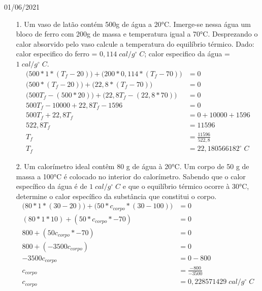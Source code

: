 \documentclass{SchoolBook}
\begin{document}
    \begin{day}{01/06/2021}
        \begin{enumerate}
            \item[1.] Um vaso de latão contém 500g de água a 20°C. Imerge-se nessa água um bloco de ferro com 200g de massa e temperatura igual a 70°C. Desprezando o calor absorvido pelo vaso calcule a temperatura do equilíbrio térmico. Dado: calor especifico do ferro = $0,114\;cal/g^\circ\;C$; calor especifico da água = $1\;cal/g^\circ\;C$.
            \begin{align*}
                \Big(500 * 1     * (T_f - 20)\Big) +
                \Big(200 * 0,114 * (T_f - 70)\Big) &= 0                     \\
                \Big(500         * (T_f - 20)\Big) +
                \Big(22,8        * (T_f - 70)\Big) &= 0                     \\
                  \Big(500 T_f - (500 * 20)\Big)   +
                 \Big(22,8 T_f - (22,8 * 70)\Big)  &= 0                     \\
                       500 T_f -  10000            +
                      22,8 T_f -  1596             &= 0                     \\
                       500 T_f                     +
                      22,8 T_f                     &= 0 + 10000 + 1596      \\
                     522,8 T_f                     &= 11596                 \\
                           T_f                     &= \frac{11596}{522,8}   \\
                           T_f                     &= 22,180566182^\circ\;C
            \end{align*}
            
            \item[2.] Um calorímetro ideal contêm 80 g de água à 20°C. Um corpo de 50 g de massa a 100°C é colocado no interior do calorímetro. Sabendo que o calor específico da água é de $1\;cal/g^\circ\;C$ e que o equilíbrio térmico ocorre à 30°C, determine o calor específico da substância que constitui o corpo.
            \begin{align*}
                \Big(80 * 1         * (30 - 20) \Big) +
                \Big(50 * c_{corpo} * (30 - 100)\Big) &= 0 \\
                    (80 * 1         *  10           ) +
                    (50 * c_{corpo} * -70           ) &= 0 \\
                     800 +
                     (50 c_{corpo} * -70) &= 0 \\
                800 + (-3500 c_{corpo}) &= 0 \\
                -3500 c_{corpo} &= 0 - 800 \\
                c_{corpo} &= \frac{-800}{-3500} \\
                c_{corpo} &= 0,228571429\;cal/g^\circ\;C
            \end{align*}
            

\end{enumerate}
\end{day}
\end{document}

